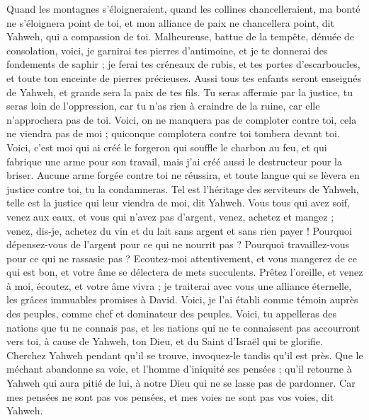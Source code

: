 \begin{multicols}{2}
Quand les montagnes s'éloigneraient, quand les collines chancelleraient, ma bonté ne s'éloignera point de toi, et mon alliance de paix ne chancellera point, dit Yahweh, qui a compassion de toi.
Malheureuse, battue de la tempête, dénuée de consolation, voici, je garnirai tes pierres d'antimoine, et je te donnerai des fondements de saphir ;
je ferai tes créneaux de rubis, et tes portes d'escarboucles, et toute ton enceinte de pierres précieuses.
Aussi tous tes enfants seront enseignés de Yahweh, et grande sera la paix de tes fils.
Tu seras affermie par la justice, tu seras loin de l'oppression, car tu n'as rien à craindre de la ruine, car elle n'approchera pas de toi.
Voici, on ne manquera pas de comploter contre toi, cela ne viendra pas de moi ; quiconque complotera contre toi tombera devant toi.
Voici, c'est moi qui ai créé le forgeron qui souffle le charbon au feu, et qui fabrique une arme pour son travail, mais j'ai créé aussi le destructeur pour la briser.
Aucune arme forgée contre toi ne réussira, et toute langue qui se lèvera en justice contre toi, tu la condamneras. Tel est l'héritage des serviteurs de Yahweh, telle est la justice qui leur viendra de moi, dit Yahweh.
\VerseOne{}Vous tous qui avez soif, venez aux eaux, et vous qui n'avez pas d'argent, venez, achetez et mangez ; venez, dis-je, achetez du vin et du lait sans argent et sans rien payer !
Pourquoi dépensez-vous de l'argent pour ce qui ne nourrit pas ? Pourquoi travaillez-vous pour ce qui ne rassasie pas ? Ecoutez-moi attentivement, et vous mangerez de ce qui est bon, et votre âme se délectera de mets succulents.
Prêtez l'oreille, et venez à moi, écoutez, et votre âme vivra ; je traiterai avec vous une alliance éternelle, les grâces immuables promises à David.
Voici, je l'ai établi comme témoin auprès des peuples, comme chef et dominateur des peuples.
Voici, tu appelleras des nations que tu ne connais pas, et les nations qui ne te connaissent pas accourront vers toi, à cause de Yahweh, ton Dieu, et du Saint d'Israël qui te glorifie.
Cherchez Yahweh pendant qu'il se trouve, invoquez-le tandis qu'il est près.
Que le méchant abandonne sa voie, et l'homme d'iniquité ses pensées ; qu'il retourne à Yahweh qui aura pitié de lui, à notre Dieu qui ne se lasse pas de pardonner.
Car mes pensées ne sont pas vos pensées, et mes voies ne sont pas vos voies, dit Yahweh.

\end{multicols}
